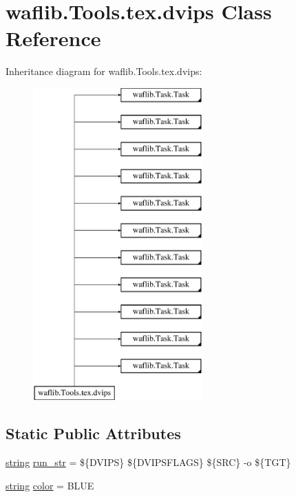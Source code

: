 \hypertarget{classwaflib_1_1_tools_1_1tex_1_1dvips}{}\section{waflib.\+Tools.\+tex.\+dvips Class Reference}
\label{classwaflib_1_1_tools_1_1tex_1_1dvips}
Inheritance diagram for waflib.\+Tools.\+tex.\+dvips\+:\begin{figure}[H]
\begin{center}
\leavevmode
\includegraphics[height=12.000000cm]{classwaflib_1_1_tools_1_1tex_1_1dvips}
\end{center}
\end{figure}
\subsection*{Static Public Attributes}
\begin{DoxyCompactItemize}
\item 
\hyperlink{test__lib_f_l_a_c_2format_8c_ab02026ad0de9fb6c1b4233deb0a00c75}{string} \hyperlink{classwaflib_1_1_tools_1_1tex_1_1dvips_a9aa6b5f344f9d83b8f4333634f3de1c5}{run\+\_\+str} = \textquotesingle{}\$\{D\+V\+I\+PS\} \$\{D\+V\+I\+P\+S\+F\+L\+A\+GS\} \$\{S\+RC\} -\/o \$\{T\+GT\}\textquotesingle{}
\item 
\hyperlink{test__lib_f_l_a_c_2format_8c_ab02026ad0de9fb6c1b4233deb0a00c75}{string} \hyperlink{classwaflib_1_1_tools_1_1tex_1_1dvips_a7d4aeecaf0cfdb4c53a6ec1823ca9dd0}{color} = \textquotesingle{}B\+L\+UE\textquotesingle{}
\end{DoxyCompactItemize}
